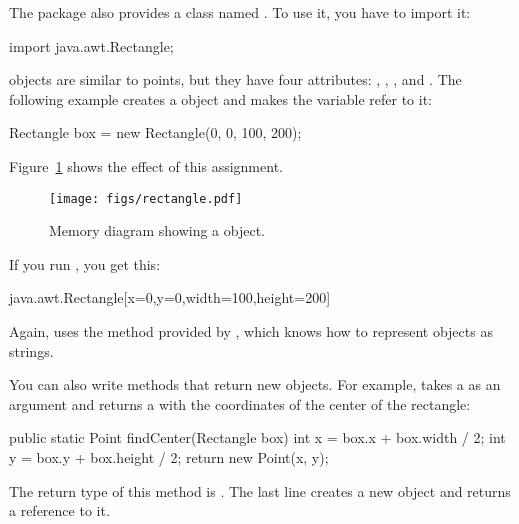 
The  package also provides a class named .
To use it, you have to import it:

\begin{code}
import java.awt.Rectangle;
\end{code}

 objects are similar to points, but they have four attributes: , , , and .
The following example creates a  object and makes the variable  refer to it:

\begin{code}
Rectangle box = new Rectangle(0, 0, 100, 200);
\end{code}

Figure~\ref{fig.rectangle} shows the effect of this assignment.

\begin{figure}[!ht]
\begin{center}
\texttt{[image: figs/rectangle.pdf]}
\caption{Memory diagram showing a  object.}
\label{fig.rectangle}
\end{center}
\end{figure}

If you run , you get this:

\begin{stdout}
java.awt.Rectangle[x=0,y=0,width=100,height=200]
\end{stdout}

Again,  uses the  method provided by , which knows how to represent  objects as strings.


You can also write methods that return new objects.
For example,  takes a  as an argument and returns a  with the coordinates of the center of the rectangle:

\begin{code}
public static Point findCenter(Rectangle box) {
    int x = box.x + box.width / 2;
    int y = box.y + box.height / 2;
    return new Point(x, y);
}
\end{code}

The return type of this method is .
The last line creates a new  object and returns a reference to it.

